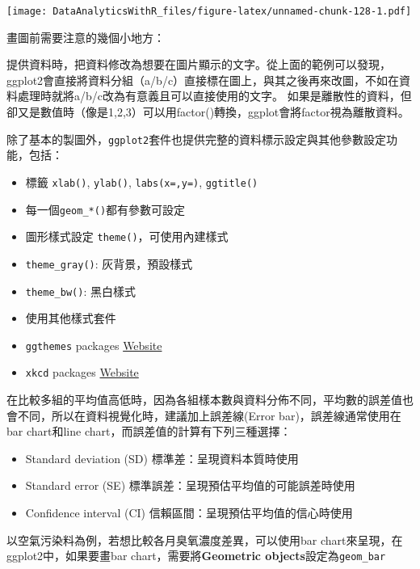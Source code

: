 \documentclass[]{book}
\providecommand{\tightlist}{%
  \setlength{\itemsep}{0pt}\setlength{\parskip}{0pt}}
\theoremstyle{definition}
\theoremstyle{definition}
\theoremstyle{remark}
\begin{document}
\texttt{[image: DataAnalyticsWithR\_files/figure-latex/unnamed-chunk-128-1.pdf]}

畫圖前需要注意的幾個小地方：

提供資料時，把資料修改為想要在圖片顯示的文字。從上面的範例可以發現，ggplot2會直接將資料分組（a/b/c）直接標在圖上，與其之後再來改圖，不如在資料處理時就將a/b/c改為有意義且可以直接使用的文字。
如果是離散性的資料，但卻又是數值時（像是1,2,3）可以用factor()轉換，ggplot會將factor視為離散資料。

除了基本的製圖外，\texttt{ggplot2}套件也提供完整的資料標示設定與其他參數設定功能，包括：

\begin{itemize}
\tightlist
\item
  標籤 \texttt{xlab()}, \texttt{ylab()}, \texttt{labs(x=,y=)},
  \texttt{ggtitle()}
\item
  每一個\texttt{geom\_*()}都有參數可設定
\item
  圖形樣式設定 \texttt{theme()}，可使用內建樣式
\item
  \texttt{theme\_gray()}: 灰背景，預設樣式
\item
  \texttt{theme\_bw()}: 黑白樣式
\item
  使用其他樣式套件
\item
  \texttt{ggthemes} packages
  \href{https://cran.r-project.org/web/packages/ggthemes/vignettes/ggthemes.html}{Website}
\item
  \texttt{xkcd} packages
  \href{http://xkcd.r-forge.r-project.org/}{Website}
\end{itemize}

在比較多組的平均值高低時，因為各組樣本數與資料分佈不同，平均數的誤差值也會不同，所以在資料視覺化時，建議加上誤差線(Error
bar)，誤差線通常使用在bar chart和line
chart，而誤差值的計算有下列三種選擇：

\begin{itemize}
\tightlist
\item
  Standard deviation (SD) 標準差：呈現資料本質時使用
\item
  Standard error (SE) 標準誤差：呈現預估平均值的可能誤差時使用
\item
  Confidence interval (CI) 信賴區間：呈現預估平均值的信心時使用
\end{itemize}

以空氣污染料為例，若想比較各月臭氧濃度差異，可以使用bar
chart來呈現，在ggplot2中，如果要畫bar chart，需要將\textbf{Geometric
objects}設定為\texttt{geom\_bar}
\end{document}
